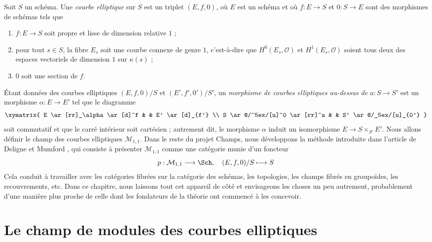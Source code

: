 \noindent
Soit $S$ un schéma. Une {\it courbe elliptique} sur $S$ est un triplet
$(E, f, 0)$, où $E$ est un schéma et où $f : E \to S$ et $0 : S \to E$
sont des morphismes de schémas tels que
\begin{enumerate}
\item $f : E \to S$ soit propre et lisse de dimension relative $1$ ;
\item pour tout $s \in S$, la fibre $E_s$ soit une courbe connexe
de genre $1$, c'est-à-dire que $H^0(E_s, \mathcal{O})$ et
$H^1(E_s, \mathcal{O})$ soient tous deux des espaces vectoriels de dimension
$1$ sur $\kappa(s)$ ;
\item $0$ soit une section de $f$.
\end{enumerate}
Étant données des courbes elliptiques $(E, f, 0)/S$ et $(E', f', 0')/S'$, un
{\it morphisme de courbes elliptiques au-dessus de $a : S \to S'$}
est un morphisme $\alpha : E \to E'$ tel que le diagramme
$$
\xymatrix{
E \ar[rr]_\alpha \ar[d]^f & & E' \ar[d]_{f'}  \\
S \ar@/^5ex/[u]^0 \ar[rr]^a & & S' \ar@/_5ex/[u]_{0'}
}
$$
soit commutatif et que le carré intérieur soit cartésien ; autrement dit, le
morphisme $\alpha$ induit un isomorphisme $E \to S \times_{S'} E'$.
Nous allons définir le champ des courbes elliptiques $\mathcal{M}_{1, 1}$.
Dans le reste du projet Champs, nous développons la méthode introduite dans
l'article de Deligne et Mumford \cite{DM}, qui consiste à présenter
$\mathcal{M}_{1, 1}$ comme une catégorie munie d'un foncteur
$$
p : \mathcal{M}_{1, 1} \longrightarrow \Sch, \quad
(E, f, 0)/S \longmapsto S
$$
Cela conduit à travailler avec les catégories fibrées sur la catégorie des
schémas, les topologies, les champs fibrés en groupoïdes, les recouvrements,
etc. Dans ce chapitre, nous laissons tout cet appareil de côté et envisageons
les choses un peu autrement, probablement d'une manière plus proche de celle
dont les fondateurs de la théorie ont commencé à les concevoir.


\section{Le champ de modules des courbes elliptiques}
\label{section-moduli-elliptic-curves}

